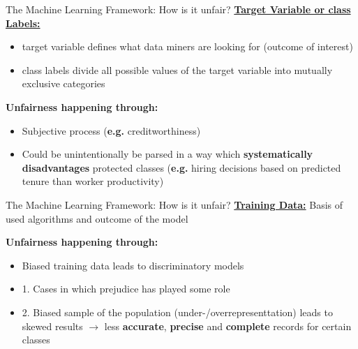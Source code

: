 \begin{frame}{The Machine Learning Framework: How is it unfair? \cite{Barocas.2016}}
    \underline{\textbf{Target Variable or class Labels:}} \\
    \begin{itemize}
        \item target variable defines what data miners are looking for (outcome of interest)
        \item class labels divide all possible values of the target variable into mutually exclusive categories
    \end{itemize}

    \begin{block}{\textbf{Unfairness happening through:}}
    \begin{itemize}
        \item Subjective process (\textbf{e.g.} creditworthiness)
        \item Could be unintentionally be parsed in a way which \textbf{systematically disadvantages} protected classes (\textbf{e.g.} hiring decisions based on predicted tenure than worker productivity)
    \end{itemize}
        \end{block}
\end{frame}

\begin{frame}{The Machine Learning Framework: How is it unfair? \cite{Barocas.2016}}
    \underline{\textbf{Training Data:}} Basis of used algorithms and outcome of the model \newline 

    \begin{block}{\textbf{Unfairness happening through:}}
    \begin{itemize}
        \item Biased training data leads to discriminatory models
        \item 1. Cases in which prejudice has played some role
        \item 2. Biased sample of the population (under-/overrepresenttation) leads to skewed results\newline
        $\rightarrow$ less \textbf{accurate}, \textbf{precise} and \textbf{complete} records for certain classes
    \end{itemize}
        \end{block}
\end{frame}


